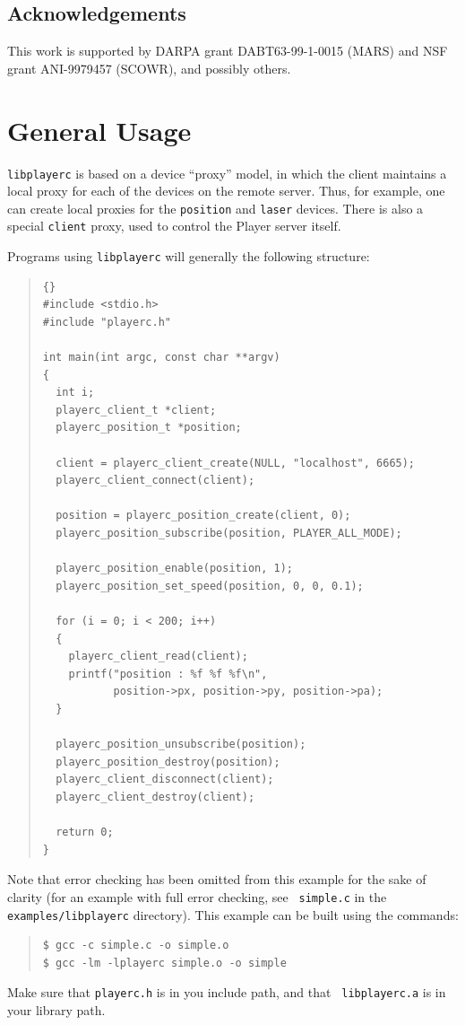 \documentclass[11pt]{report}
\def\libplayerc {{\tt libplayerc} }
\begin{document}
\section{Acknowledgements}

This work is supported by DARPA grant DABT63-99-1-0015 (MARS) and NSF
grant ANI-9979457 (SCOWR), and possibly others.


\chapter{General Usage}

\libplayerc is based on a device ``proxy'' model, in which the client
maintains a local proxy for each of the devices on the remote server.
Thus, for example, one can create local proxies for the {\tt position}
and {\tt laser} devices.  There is also a special {\tt client} proxy,
used to control the Player server itself.  

Programs using \libplayerc will generally the following structure:
\begin{quote}
\begin{lstlisting}[frame=tb]{}
#include <stdio.h>
#include "playerc.h"

int main(int argc, const char **argv)
{
  int i;
  playerc_client_t *client;
  playerc_position_t *position;

  client = playerc_client_create(NULL, "localhost", 6665);
  playerc_client_connect(client);

  position = playerc_position_create(client, 0);
  playerc_position_subscribe(position, PLAYER_ALL_MODE);

  playerc_position_enable(position, 1);
  playerc_position_set_speed(position, 0, 0, 0.1);
  
  for (i = 0; i < 200; i++)
  {
    playerc_client_read(client);
    printf("position : %f %f %f\n",
           position->px, position->py, position->pa);
  } 

  playerc_position_unsubscribe(position);
  playerc_position_destroy(position);
  playerc_client_disconnect(client);
  playerc_client_destroy(client);

  return 0;
}
\end{lstlisting}
\end{quote}
Note that error checking has been omitted from this example for the
sake of clarity (for an example with full error checking, see {\tt
simple.c} in the {\tt examples/libplayerc} directory).  This example
can be built using the commands:
\begin{quote}
\begin{verbatim}
$ gcc -c simple.c -o simple.o
$ gcc -lm -lplayerc simple.o -o simple
\end{verbatim}
\end{quote}
Make sure that {\tt playerc.h} is in you include path, and that {\tt
libplayerc.a} is in your library path.
\end{document}
